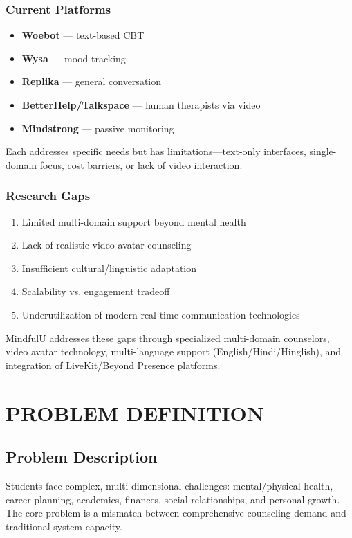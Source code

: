 \documentclass[11pt,a4paper]{report}
\begin{document}
\subsection{Current Platforms}
\begin{itemize}
    \item \textbf{Woebot} --- text-based CBT
    \item \textbf{Wysa} --- mood tracking
    \item \textbf{Replika} --- general conversation
    \item \textbf{BetterHelp/Talkspace} --- human therapists via video
    \item \textbf{Mindstrong} --- passive monitoring
\end{itemize}

Each addresses specific needs but has limitations---text-only interfaces, single-domain focus, cost barriers, or lack of video interaction.

\subsection{Research Gaps}
\begin{enumerate}
    \item Limited multi-domain support beyond mental health
    \item Lack of realistic video avatar counseling
    \item Insufficient cultural/linguistic adaptation
    \item Scalability vs. engagement tradeoff
    \item Underutilization of modern real-time communication technologies
\end{enumerate}

MindfulU addresses these gaps through specialized multi-domain counselors, video avatar technology, multi-language support (English/Hindi/Hinglish), and integration of LiveKit/Beyond Presence platforms.

\chapter{PROBLEM DEFINITION}

\section{Problem Description}
Students face complex, multi-dimensional challenges: mental/physical health, career planning, academics, finances, social relationships, and personal growth. The core problem is a mismatch between comprehensive counseling demand and traditional system capacity.
\end{document}
